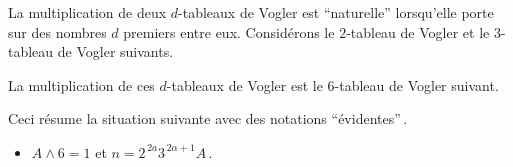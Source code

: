 \begin{example}
	La multiplication de deux $d$-tableaux de Vogler est \enquote{naturelle} lorsqu'elle porte sur des nombres $d$ premiers entre eux.
	Considérons le $2$-tableau de Vogler et le $3$-tableau de Vogler suivants.
	
	\vspace{-1.5ex}
	\begin{multicols}{2}
	\begin{center}
	\end{center}

	\begin{center}
	\end{center}
	\end{multicols}


	\vspace{-1ex}
	La multiplication de ces $d$-tableaux de Vogler est le $6$-tableau de Vogler suivant.

	\begin{center}
	\end{center}
	
	Ceci résume la situation suivante avec des notations \enquote{évidentes}\,. 
	
	
	\vspace{-1ex}
	\begin{multicols}{2}
	\begin{itemize}
		\item $A \wedge 6 = 1$
		      et
		      $n     = 2^{\,2a}   3^{\,2\alpha+1} A$\,.


\end{itemize}
\end{multicols}
\end{example}
